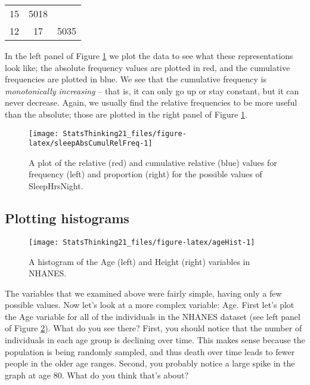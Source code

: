 \documentclass[]{book}
\theoremstyle{definition}
\theoremstyle{definition}
\theoremstyle{definition}
\theoremstyle{remark}
\begin{document}
\begin{longtable}[]{@{}ccc@{}}
\begin{minipage}[t]{0.25\columnwidth}
15\strut
\end{minipage} & \begin{minipage}[t]{0.27\columnwidth}\centering\strut
5018\strut
\end{minipage}\tabularnewline
\begin{minipage}[t]{0.20\columnwidth}\centering\strut
12\strut
\end{minipage} & \begin{minipage}[t]{0.25\columnwidth}\centering\strut
17\strut
\end{minipage} & \begin{minipage}[t]{0.27\columnwidth}\centering\strut
5035\strut
\end{minipage}\tabularnewline
\bottomrule
\end{longtable}

In the left panel of Figure \ref{fig:sleepAbsCumulRelFreq} we plot the
data to see what these representations look like; the absolute frequency
values are plotted in red, and the cumulative frequencies are plotted in
blue. We see that the cumulative frequency is \emph{monotonically
increasing} -- that is, it can only go up or stay constant, but it can
never decrease. Again, we usually find the relative frequencies to be
more useful than the absolute; those are plotted in the right panel of
Figure \ref{fig:sleepAbsCumulRelFreq}.

\begin{figure}
\texttt{[image: StatsThinking21\_files/figure-latex/sleepAbsCumulRelFreq-1]} \caption{A plot of the relative (red) and cumulative relative (blue) values for frequency (left) and proportion (right) for the possible values of SleepHrsNight.}\label{fig:sleepAbsCumulRelFreq}
\end{figure}\newpage

\subsection{Plotting histograms}\label{plotting-histograms}

\begin{figure}
\texttt{[image: StatsThinking21\_files/figure-latex/ageHist-1]} \caption{A histogram of the Age (left) and Height (right) variables in NHANES.}\label{fig:ageHist}
\end{figure}

The variables that we examined above were fairly simple, having only a
few possible values. Now let's look at a more complex variable: Age.
First let's plot the Age variable for all of the individuals in the
NHANES dataset (see left panel of Figure \ref{fig:ageHist}). What do you
see there? First, you should notice that the number of individuals in
each age group is declining over time. This makes sense because the
population is being randomly sampled, and thus death over time leads to
fewer people in the older age ranges. Second, you probably notice a
large spike in the graph at age 80. What do you think that's about?
\end{document}
